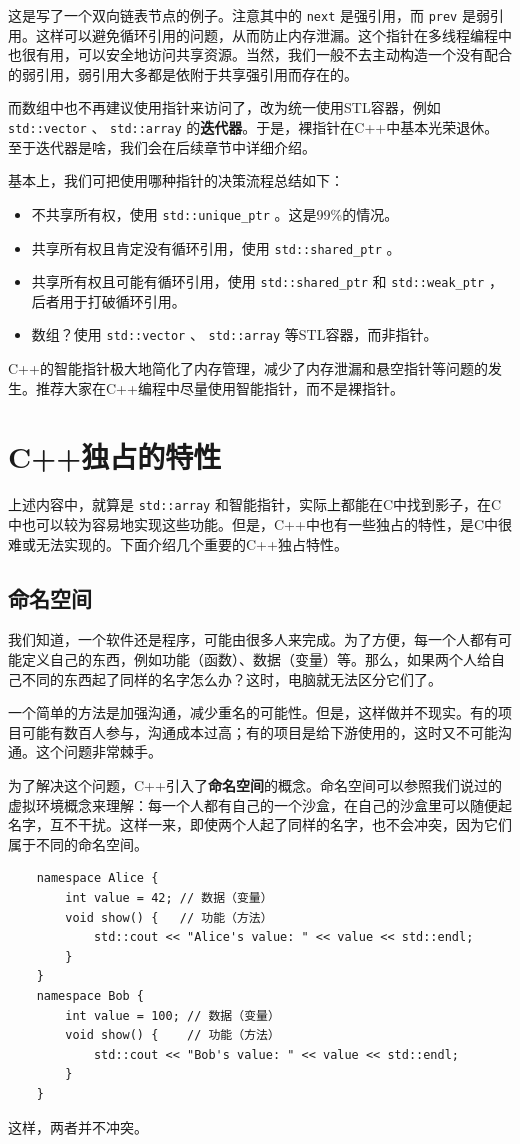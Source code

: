 这是写了一个双向链表节点的例子。注意其中的 \texttt{next} 是强引用，而 \texttt{prev} 是弱引用。这样可以避免循环引用的问题，从而防止内存泄漏。这个指针在多线程编程中也很有用，可以安全地访问共享资源。当然，我们一般不去主动构造一个没有配合的弱引用，弱引用大多都是依附于共享强引用而存在的。

而数组中也不再建议使用指针来访问了，改为统一使用STL容器，例如 \texttt{std::vector} 、 \texttt{std::array} 的\textbf{迭代器}。于是，裸指针在C++中基本光荣退休。至于迭代器是啥，我们会在后续章节中详细介绍。

基本上，我们可把使用哪种指针的决策流程总结如下：
\begin{itemize}
  \item 不共享所有权，使用 \texttt{std::unique\_ptr} 。这是99\%的情况。
  \item 共享所有权且肯定没有循环引用，使用 \texttt{std::shared\_ptr} 。
  \item 共享所有权且可能有循环引用，使用 \texttt{std::shared\_ptr} 和 \texttt{std::weak\_ptr} ，后者用于打破循环引用。
  \item 数组？使用 \texttt{std::vector} 、 \texttt{std::array} 等STL容器，而非指针。
\end{itemize}

C++的智能指针极大地简化了内存管理，减少了内存泄漏和悬空指针等问题的发生。推荐大家在C++编程中尽量使用智能指针，而不是裸指针。

\section{C++独占的特性}

上述内容中，就算是 \texttt{std::array} 和智能指针，实际上都能在C中找到影子，在C中也可以较为容易地实现这些功能。但是，C++中也有一些独占的特性，是C中很难或无法实现的。下面介绍几个重要的C++独占特性。

\subsection{命名空间}

我们知道，一个软件还是程序，可能由很多人来完成。为了方便，每一个人都有可能定义自己的东西，例如功能（函数）、数据（变量）等。那么，如果两个人给自己不同的东西起了同样的名字怎么办？这时，电脑就无法区分它们了。

一个简单的方法是加强沟通，减少重名的可能性。但是，这样做并不现实。有的项目可能有数百人参与，沟通成本过高；有的项目是给下游使用的，这时又不可能沟通。这个问题非常棘手。

为了解决这个问题，C++引入了\textbf{命名空间}的概念。命名空间可以参照我们说过的虚拟环境概念来理解：每一个人都有自己的一个沙盒，在自己的沙盒里可以随便起名字，互不干扰。这样一来，即使两个人起了同样的名字，也不会冲突，因为它们属于不同的命名空间。
\begin{verbatim}
    namespace Alice {
        int value = 42; // 数据（变量）
        void show() {   // 功能（方法）
            std::cout << "Alice's value: " << value << std::endl;
        }
    }
    namespace Bob {
        int value = 100; // 数据（变量）
        void show() {    // 功能（方法）
            std::cout << "Bob's value: " << value << std::endl;
        }
    }
\end{verbatim}
这样，两者并不冲突。

